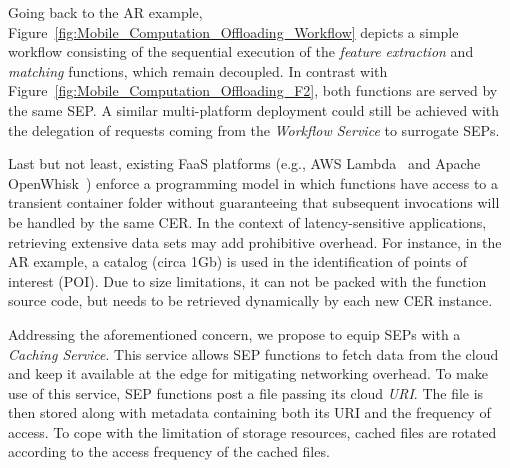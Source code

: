 Going back to the AR example, Figure~\ref{fig:Mobile_Computation_Offloading_Workflow} depicts a simple workflow consisting of the sequential execution of the \textit{feature extraction} and \textit{matching} functions, which remain decoupled. In contrast with Figure~\ref{fig:Mobile_Computation_Offloading_F2}, both functions are served by the same SEP. A similar multi-platform deployment could still be achieved with the delegation of requests coming from the \textit{Workflow Service} to surrogate SEPs.

Last but not least, existing FaaS platforms (e.g., AWS Lambda~\cite{AWSLambda} and Apache OpenWhisk~\cite{OpenWhisk}) enforce a programming model in which functions have access to a transient container folder without guaranteeing that subsequent invocations will be handled by the same CER. %
In the context of latency-sensitive applications, retrieving extensive data sets may add prohibitive overhead. For instance, in the AR example, a catalog (circa 1Gb) is used in the identification of points of interest (POI).
Due to size limitations, it can not be packed with the function source code, but needs to be retrieved dynamically by each new CER instance.

Addressing the aforementioned concern, we propose to equip SEPs with a \textit{Caching Service}. This service allows SEP functions to fetch data from the cloud and keep it available at the edge for mitigating networking overhead. 
To make use of this service, SEP functions post a file passing its cloud \textit{URI}.
The file is then stored along with metadata containing both its URI and the frequency of access. %
To cope with the limitation of storage resources, cached files are rotated according to the access frequency of the cached files. %

